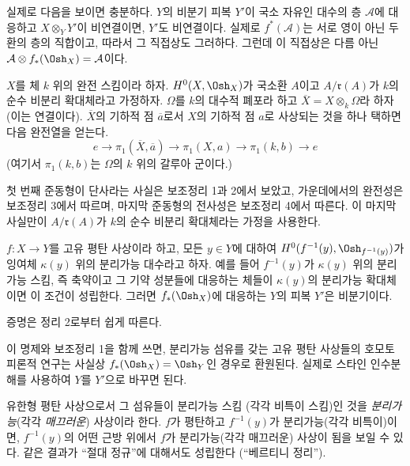 실제로 다음을 보이면 충분하다. $Y$의 비분기 피복 $Y'$이 국소 자유인
대수의 층 $\mathcal A$에 대응하고 $X\otimes_Y Y'$이 비연결이면,
$Y'$도 비연결이다. 실제로 $f^*(\mathcal A)$는 서로 영이 아닌 두 환의
층의 직합이고, 따라서 그 직접상도 그러하다. 그런데 이 직접상은 다름
아닌
$\mathcal A\otimes f_*(\Osh_X)=\mathcal A$이다.

 $X$를 체 $k$ 위의 완전 스킴이라 하자.
$H^0(X,\Osh_X)$가 국소환 $A$이고 $A/\mathfrak r(A)$가 $k$의 순수
비분리 확대체라고 가정하자. $\Omega$를 $k$의 대수적 폐포라 하고
$\overline X=X\otimes_k\Omega$라 하자(이는 연결이다). $\overline X$의
기하적 점 $\overline a$로서 $X$의 기하적 점 $a$로 사상되는 것을 하나
택하면 다음 완전열을 얻는다.
\[
  e\longrightarrow\pi_1(\overline X,\overline a)
  \longrightarrow\pi_1(X,a)
  \longrightarrow\pi_1(k,b)\longrightarrow e
\]
(여기서 $\pi_1(k,b)$는 $\Omega$의 $k$ 위의 갈루아 군이다.)

첫 번째 준동형이 단사라는 사실은 보조정리 1과 2에서 보았고, 가운데에서의
완전성은 보조정리 3에서 따르며, 마지막 준동형의 전사성은 보조정리 4에서
따른다. 이 마지막 사실만이 $A/\mathfrak r(A)$가 $k$의 순수 비분리
확대체라는 가정을 사용한다.

 $f:X\longrightarrow Y$를 고유 평탄 사상이라 하고,
모든 $y\in Y$에 대하여
$H^0(f^{-1}(y),\Osh_{f^{-1}(y)})$가 잉여체 $\kappa(y)$ 위의 분리가능
대수라고 하자. 예를 들어 $f^{-1}(y)$가 $\kappa(y)$ 위의 분리가능
스킴, 즉 축약이고 그 기약 성분들에 대응하는 체들이 $\kappa(y)$의
분리가능 확대체이면 이 조건이 성립한다. 그러면 $f_*(\Osh_X)$에
대응하는 $Y$의 피복 $Y'$은 비분기이다.

증명은 정리 2로부터 쉽게 따른다.

이 명제와 보조정리 1을 함께 쓰면, 분리가능 섬유를 갖는 고유 평탄
사상들의 호모토피론적 연구는 사실상 $f_*(\Osh_X)=\Osh_Y$인 경우로
환원된다. 실제로 스타인 인수분해를 사용하여 $Y$를 $Y'$으로 바꾸면 된다.

 유한형 평탄 사상으로서 그 섬유들이 분리가능 스킴
(각각 비특이 스킴)인 것을 \emph{분리가능}(각각 \emph{매끄러운})
사상이라 한다. $f$가 평탄하고 $f^{-1}(y)$가 분리가능(각각 비특이)이면,
$f^{-1}(y)$의 어떤 근방 위에서 $f$가 분리가능(각각 매끄러운) 사상이
됨을 보일 수 있다. 같은 결과가 “절대 정규”에 대해서도 성립한다
(“베르티니 정리”).

